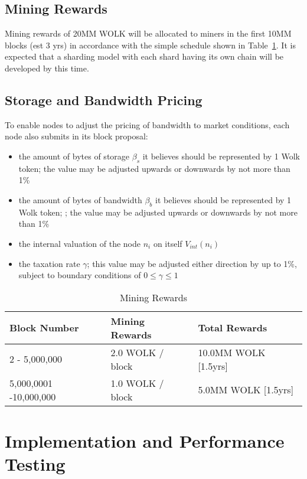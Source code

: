 \documentclass[journal]{IEEEtran}
\begin{document}
\subsection{Mining Rewards}

Mining rewards of 20MM WOLK will be allocated to miners in the first 10MM blocks (est 3 yrs) in accordance with the simple schedule shown in Table~\ref{tab:mining}.  It is expected that a sharding model with each shard having its own chain will be developed by this time.

\subsection{Storage and Bandwidth Pricing}

To enable nodes to adjust the pricing of bandwidth to market conditions, each node also submits in its block proposal:
\begin{itemize}
    \item the amount of bytes of storage $\beta_{s}$ it believes should be represented by 1 Wolk token; the value may be adjusted upwards or downwards by not more than 1\%
    \item the amount of bytes of bandwidth $\beta_{b}$ it believes should be represented by 1 Wolk token; ; the value may be adjusted upwards or downwards by not more than 1\%
    \item the internal valuation of the node $n_i$ on itself $V_{int}(n_i)$
    \item the taxation rate $\gamma$; this value may be adjusted either direction by up to 1\%, subject to boundary conditions of $0 \le \gamma \le 1$
\end{itemize}

\begin{table}[h]
    \centering
    \begin{tabular}{|l|l|l|} \hline
        {\bf Block Number}      & {\bf Mining Rewards}    & {\bf Total Rewards} \\ \hline
        2          - 5,000,000  &  2.0 WOLK / block & 10.0MM WOLK [1.5yrs] \\
        5,000,0001 -10,000,000  &  1.0 WOLK / block & 5.0MM WOLK [1.5yrs] \\
        \hline
    \end{tabular}
    \caption{Mining Rewards}
    \label{tab:mining}
\end{table}

\section{Implementation and Performance Testing}
\end{document}
